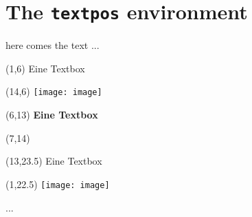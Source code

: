 \documentclass[17pt]{extarticle}
\begin{document}
\section{The \texttt{textpos} environment}
here comes the text ...

\begin{textblock}{10}(1,6)
{\color{red!65!black!100!}
Eine Textbox}
\end{textblock}

\begin{textblock}{14}(14,6)
\texttt{[image: image]}
\end{textblock}

\begin{textblock}{10}(6,13)
{\color{red!65!black!100!}
\huge\textbf{Eine Textbox}}
\end{textblock}

\begin{textblock}{14}(7,14)
{\color{blue!65!black!100!}} %
\end{textblock}

\begin{textblock}{10}(13,23.5)
{\color{red!65!black!100!}
Eine Textbox}
\end{textblock}

\begin{textblock}{14}(1,22.5)
\texttt{[image: image]}
\end{textblock}

\vfill\hfill ... \the\textheight
\end{document}
